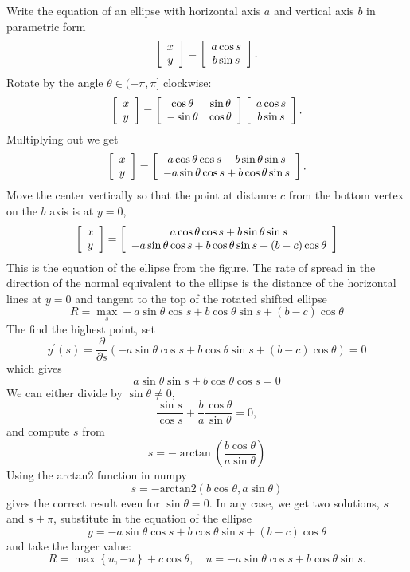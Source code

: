 \documentclass{article}
\begin{document}
Write the equation of an ellipse with horizontal axis $a$ and vertical axis
$b$ in parametric form
$$
\left[
\begin{array}
[c]{c}
x\\
y
\end{array}
\right]  =\left[
\begin{array}
[c]{c}
a\cos s\\
b\sin s
\end{array}
\right] .
$$
Rotate by the angle $\theta\in(-\pi,\pi]$ clockwise:
$$
\left[
\begin{array}
[c]{c}
x\\
y
\end{array}
\right]  =\left[
\begin{array}
[c]{cc}
\cos\theta & \sin\theta\\
-\sin\theta & \cos\theta
\end{array}
\right]  \left[
\begin{array}
[c]{c}
a\cos s\\
b\sin s
\end{array}
\right]  .
$$
Multiplying out we get
$$
\left[
\begin{array}
[c]{c}
x\\
y
\end{array}
\right]  =\left[
\begin{array}
[c]{c}
a\cos\theta\cos s+b\sin\theta\sin s\\
-a\sin\theta\cos s+b\cos\theta\sin s
\end{array}
\right]  .
$$
Move the center vertically so that the point at distance $c$ from the bottom
vertex on the $b$ axis is at $y=0$,
$$
\left[
\begin{array}
[c]{c}
x\\
y
\end{array}
\right]  =\left[
\begin{array}
[c]{c}
a\cos\theta\cos s+b\sin\theta\sin s\\
-a\sin\theta\cos s+b\cos\theta\sin s+(b-c)\cos\theta
\end{array}
\right]
$$
This is the equation of the ellipse from the figure. The rate of spread in the
direction of the normal equivalent to the ellipse is the distance of the
horizontal lines at $y=0$ and tangent to the top of the rotated shifted
ellipse
$$
R=\max_{s}-a\sin\theta\cos s+b\cos\theta\sin s+(b-c)\cos\theta
$$
The find the highest point, set
$$
y^{\prime}\left(  s\right)  =\frac{\partial}{\partial s}\left(  -a\sin
\theta\cos s+b\cos\theta\sin s+(b-c)\cos\theta\right)  =0
$$
which gives
$$
a\sin\theta\sin s+b\cos\theta\cos s=0
$$
We can either divide by $\sin\theta\neq0$,
$$
\frac{\sin s}{\cos s}+\frac{b}{a}\frac{\cos\theta}{\sin\theta}=0,
$$
and compute $s$ from
$$
s=-\arctan\left(  \frac{b\cos\theta}{a\sin\theta}\right)
$$
Using the arctan2 function in numpy
$$
s=-\text{arctan2}\left(  b\cos\theta,a\sin\theta\right)
$$
gives the correct result even for $\sin\theta=0.$ In any case, we get two solutions, $s$
and $s+\pi$,  substitute in the equation of the ellipse
$$
y=-a\sin\theta\cos s+b\cos\theta\sin s+\left(  b-c\right)  \cos\theta
$$
and take the larger value:
$$
R=\max\left\{  u,-u\right\}  +c\cos\theta,\quad u=-a\sin\theta\cos
s+b\cos\theta\sin s.
$$
\end{document}
